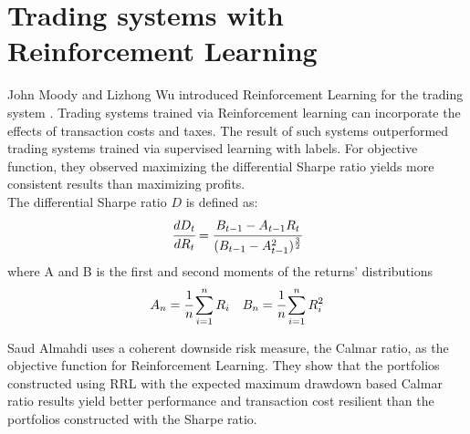 \section{Trading systems with Reinforcement Learning}
John Moody and Lizhong Wu introduced Reinforcement Learning for the trading system \cite{618952}. Trading systems trained via Reinforcement learning can incorporate the effects of transaction costs and taxes. The result of such systems outperformed trading systems trained via supervised learning with labels. For objective function, they observed maximizing the differential Sharpe ratio yields more consistent results than maximizing profits.\cite{618952,moody1998performance}\\
The differential Sharpe ratio \(D\) is defined as:
\[
\cfrac{d D_t}{d R_t} = 
\cfrac{B_{t-1}-A_{t-1} R_t}{(B_{t-1}-A_{t-1}^2)^\frac{3}{2}}
\]
where
A and B is the first and second moments of the returns' distributions
\[ A_n = \cfrac{1}{n}\sum_{i=1}^nR_i\quad
B_n = \cfrac{1}{n}\sum_{i=1}^nR_i^2
\]

Saud Almahdi uses a coherent downside risk measure, the Calmar ratio,  as the objective function for Reinforcement Learning. \cite{AdaptivePortfolioTradingSystem} They show that the portfolios constructed using RRL with the expected maximum drawdown based Calmar ratio results yield better performance and transaction cost resilient than the portfolios constructed with the Sharpe ratio. 